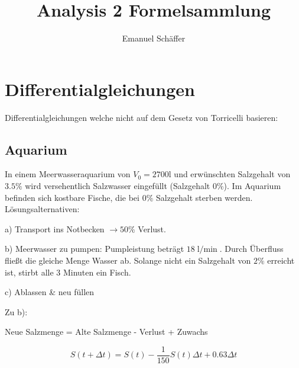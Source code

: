 \documentclass[a4paper, ngerman, 11pt]{scrarticle}
\begin{document}
	\title{Analysis 2 Formelsammlung}
	\author{Emanuel Schäffer}
	\maketitle
	
	\section*{Differentialgleichungen}
	Differentialgleichungen welche nicht auf dem Gesetz von Torricelli basieren:
	
	\subsection*{Aquarium}
	In einem Meerwasseraquarium von $V_0 = 2700\si{\litre}$ und erwünschten Salzgehalt von $3.5\%$ wird versehentlich Salzwasser eingefüllt (Salzgehalt 0\%). Im Aquarium befinden sich kostbare Fische, die bei $0\%$ Salzgehalt sterben werden.
	\\
	
	\noindent
	Lösungsalternativen: 
	
	a) Transport ins Notbecken $\rightarrow 50 \%$ Verlust.
	
	b) Meerwasser zu pumpen: Pumpleistung beträgt $18\si{\l\per\min}$. Durch Überfluss fließt die gleiche Menge Wasser ab. Solange nicht ein Salzgehalt von $2\%$ erreicht ist, stirbt alle 3 Minuten ein Fisch.
	
	c) Ablassen \& neu füllen
	
	Zu b):
	
	Neue Salzmenge = Alte Salzmenge - Verlust + Zuwachs
	
	$$S(t + \Delta t) = S(t) - \frac{1}{150}S(t) \Delta t + 0.63\Delta t$$
	\\
	
\end{document}
